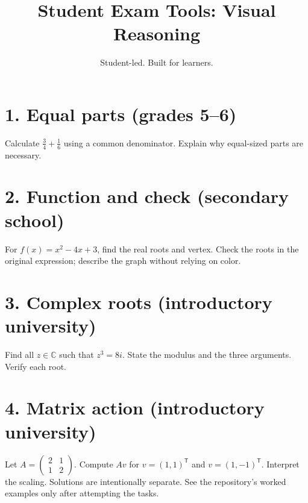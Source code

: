\documentclass[11pt,a4paper]{article}
\title{Student Exam Tools: Visual Reasoning}
\author{Student-led. Built for learners.}
\date{}
\begin{document}
\maketitle
\section*{1. Equal parts (grades 5--6)}
Calculate $\frac34+\frac16$ using a common denominator. Explain why equal-sized parts are necessary.
\section*{2. Function and check (secondary school)}
For $f(x)=x^2-4x+3$, find the real roots and vertex. Check the roots in the original expression; describe the graph without relying on color.
\section*{3. Complex roots (introductory university)}
Find all $z\in\mathbb C$ such that $z^3=8i$. State the modulus and the three arguments. Verify each root.
\section*{4. Matrix action (introductory university)}
Let $A=\begin{pmatrix}2&1\\1&2\end{pmatrix}$. Compute $Av$ for $v=(1,1)^\mathsf T$ and $v=(1,-1)^\mathsf T$. Interpret the scaling.
\bigskip
Solutions are intentionally separate. See the repository's worked examples only after attempting the tasks.
\end{document}
